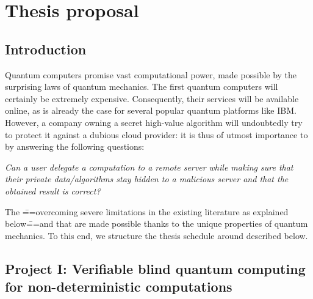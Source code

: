 

\section{Thesis proposal}

\subsection{Introduction}

Quantum computers promise vast computational power, made possible by the surprising laws of quantum mechanics. The first quantum computers will certainly be extremely expensive. Consequently, their services will be available online, as is already the case for several popular quantum platforms like IBM. However, a company owning a secret high-value algorithm will undoubtedly try to protect it against a dubious cloud provider: it is thus of utmost importance to  by answering the following questions:

\begin{center}
\vspace{-.5\baselineskip}
  \emph{Can a user delegate a computation to a remote server while making sure that their private data/algorithms stay hidden to a malicious server and that the obtained result is correct?}
  \vspace{-.5\baselineskip}
\end{center}

The \===overcoming severe limitations in the existing literature as explained below\===and  that are made possible thanks to the unique properties of quantum mechanics. To this end, we structure the thesis schedule around  described below.

\subsection{Project I: Verifiable blind quantum computing for non-deterministic computations}

